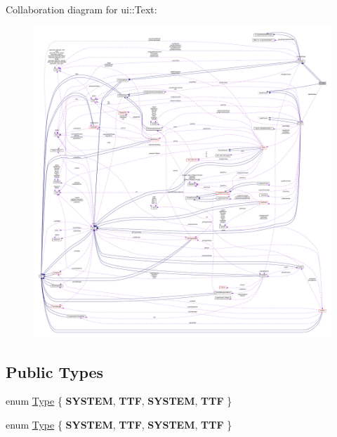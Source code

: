Collaboration diagram for ui\+:\+:Text\+:
\nopagebreak
\begin{figure}[H]
\begin{center}
\leavevmode
\includegraphics[width=350pt]{classui_1_1Text__coll__graph}
\end{center}
\end{figure}
\subsection*{Public Types}
\begin{DoxyCompactItemize}
\item 
enum \hyperlink{classui_1_1Text_a66074a2bf4b155f85115f944c6ff01ed}{Type} \{ {\bfseries S\+Y\+S\+T\+EM}, 
{\bfseries T\+TF}, 
{\bfseries S\+Y\+S\+T\+EM}, 
{\bfseries T\+TF}
 \}
\item 
enum \hyperlink{classui_1_1Text_a66074a2bf4b155f85115f944c6ff01ed}{Type} \{ {\bfseries S\+Y\+S\+T\+EM}, 
{\bfseries T\+TF}, 
{\bfseries S\+Y\+S\+T\+EM}, 
{\bfseries T\+TF}
 \}
\end{DoxyCompactItemize}

